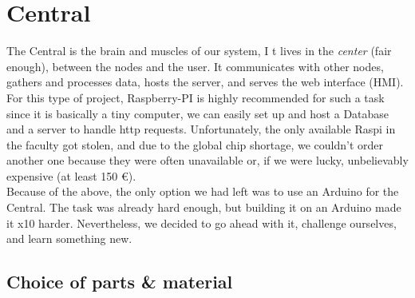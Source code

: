 \section{Central}
The Central is the brain and muscles of our system, I
t lives in the \textit{center} (fair enough), between the nodes and the user. It communicates with other nodes, gathers and processes data, hosts the server, and serves the web interface (HMI).\\
For this type of project, Raspberry-PI is highly recommended for such a task since it is basically a tiny computer, we can easily set up and host a Database and a server to handle \acrfull{http} requests. Unfortunately, the only available Raspi in the faculty got stolen, and due to the global chip shortage, we couldn't order another one because they were often unavailable or, if we were lucky, unbelievably expensive (at least 150 \euro).\\
Because of the above, the only option we had left was to use an Arduino for the Central. The task was already hard enough, but building it on an Arduino made it x10 harder. Nevertheless, we decided to go ahead with it, challenge ourselves, and learn something new.

\subsection{Choice of parts \& material}
